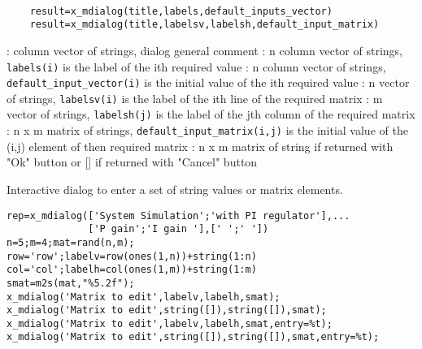 
\begin{mandesc}
   \\ %
\end{mandesc}
\label{x-mdialog}
\begin{calling_sequence}
  \begin{verbatim}
    result=x_mdialog(title,labels,default_inputs_vector)   
    result=x_mdialog(title,labelsv,labelsh,default_input_matrix)   
  \end{verbatim}
\end{calling_sequence}

\begin{parameters}
  \begin{varlist}
    : column vector of strings, dialog general comment
    : n column vector of strings, \verb!labels(i)! is the label of  the ith required value
    : n  column vector of strings, \verb!default_input_vector(i)! is the initial 
    value of  the ith required value
    : n  vector of strings, \verb!labelsv(i)! is the label of  the ith line of the required matrix
    : m  vector of strings, \verb!labelsh(j)! is the label of  the jth column of the required matrix
    : n x m matrix of strings, \verb!default_input_matrix(i,j)! is the initial value of the (i,j) element of then required matrix
    : n x m matrix of string if returned with "Ok" button or [] if returned with "Cancel" button
  \end{varlist}
\end{parameters}
\begin{mandescription}
  Interactive dialog to enter a set of string values or matrix elements.
\end{mandescription}
\begin{examples}
\begin{Verbatim}
rep=x_mdialog(['System Simulation';'with PI regulator'],...
              ['P gain';'I gain '],[' ';' '])
n=5;m=4;mat=rand(n,m);
row='row';labelv=row(ones(1,n))+string(1:n)
col='col';labelh=col(ones(1,m))+string(1:m)
smat=m2s(mat,"%5.2f");
x_mdialog('Matrix to edit',labelv,labelh,smat);
x_mdialog('Matrix to edit',string([]),string([]),smat);
x_mdialog('Matrix to edit',labelv,labelh,smat,entry=%t);
x_mdialog('Matrix to edit',string([]),string([]),smat,entry=%t);
\end{Verbatim}
\end{examples}
\begin{manseealso}
\end{manseealso}

